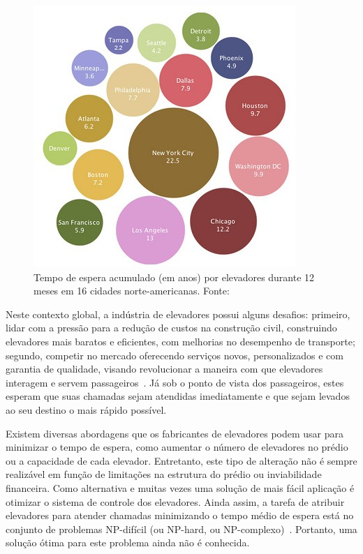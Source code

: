 \begin{figure}[htb!]
\centering\includegraphics{img/time-cost.jpg}
\caption{\label{fig:fig1}Tempo de espera acumulado (em anos) por elevadores durante 12 meses em 16 cidades norte-americanas. Fonte:~\cite{IBM10}}
\end{figure}

Neste contexto global, a indústria de elevadores possui alguns desafios: primeiro, lidar com a pressão para a redução de custos na construção civil, construindo elevadores mais baratos e eficientes, com melhorias no desempenho de transporte; segundo, competir no mercado oferecendo serviços novos, personalizados e com garantia de qualidade, visando revolucionar a maneira com que elevadores interagem e servem passageiros~\cite{KOEHLEROTTIGER02}. Já sob o ponto de vista dos passageiros, estes esperam que suas chamadas sejam atendidas imediatamente e que sejam levados ao seu destino o mais rápido possível.

Existem diversas abordagens que os fabricantes de elevadores podem usar para minimizar o tempo de espera, como aumentar o número de elevadores no prédio ou a capacidade de cada elevador. Entretanto, este tipo de alteração não é sempre realizável em função de limitações na estrutura do prédio ou inviabilidade financeira. Como alternativa e muitas vezes uma solução de mais fácil aplicação é otimizar o sistema de controle dos elevadores. Ainda assim, a tarefa de atribuir elevadores para atender chamadas minimizando o tempo médio de espera está no conjunto de problemas NP-difícil (ou NP-hard, ou NP-complexo)~\cite{SeKo99}. Portanto, uma solução ótima para este problema ainda não é conhecida.


